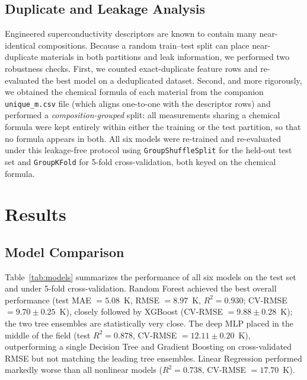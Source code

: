 \documentclass[11pt]{article}
\begin{document}
\subsection{Duplicate and Leakage Analysis}
Engineered superconductivity descriptors are known to contain many near-identical compositions. Because a
random train--test split can place near-duplicate materials in both partitions and leak information, we
performed two robustness checks. First, we counted exact-duplicate feature rows and re-evaluated the best
model on a deduplicated dataset. Second, and more rigorously, we obtained the chemical formula of each
material from the companion \texttt{unique\_m.csv} file (which aligns one-to-one with the descriptor rows)
and performed a \emph{composition-grouped} split: all measurements sharing a chemical formula were kept
entirely within either the training or the test partition, so that no formula appears in both. All six
models were re-trained and re-evaluated under this leakage-free protocol using \texttt{GroupShuffleSplit}
for the held-out test set and \texttt{GroupKFold} for 5-fold cross-validation, both keyed on the chemical
formula.

\section{Results}

\subsection{Model Comparison}
Table~\ref{tab:models} summarizes the performance of all six models on the test set and under 5-fold
cross-validation. Random Forest achieved the best overall performance (test MAE $=5.08$~K,
RMSE $=8.97$~K, $R^2 = 0.930$; CV-RMSE $=9.70 \pm 0.25$~K), closely followed by XGBoost
(CV-RMSE $=9.88 \pm 0.28$~K); the two tree ensembles are statistically very close. The deep MLP placed in
the middle of the field (test $R^2 = 0.878$, CV-RMSE $=12.11 \pm 0.20$~K), outperforming a single Decision
Tree and Gradient Boosting on cross-validated RMSE but not matching the leading tree ensembles. Linear
Regression performed markedly worse than all nonlinear models ($R^2 = 0.738$, CV-RMSE $=17.70$~K).
\end{document}
